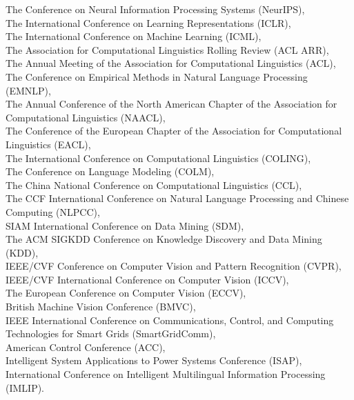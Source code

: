 \documentclass{resume}
\begin{document}
\begin{itemize}
The Conference on Neural Information Processing Systems (NeurIPS), \\
The International Conference on Learning Representations (ICLR), \\
The International Conference on Machine Learning (ICML), \\
The Association for Computational Linguistics Rolling Review (ACL ARR), \\
The Annual Meeting of the Association for Computational Linguistics (ACL), \\
The Conference on Empirical Methods in Natural Language Processing (EMNLP), \\
The Annual Conference of the North American Chapter of the Association for Computational Linguistics (NAACL), \\
The Conference of the European Chapter of the Association for Computational Linguistics (EACL), \\
The International Conference on Computational Linguistics (COLING), \\
The Conference on Language Modeling (COLM), \\
The China National Conference on Computational Linguistics (CCL), \\
The CCF International Conference on Natural Language Processing and Chinese Computing (NLPCC), \\
SIAM International Conference on Data Mining (SDM), \\
The ACM SIGKDD Conference on Knowledge Discovery and Data Mining (KDD), \\
IEEE/CVF Conference on Computer Vision and Pattern Recognition (CVPR), \\
IEEE/CVF International Conference on Computer Vision (ICCV), \\
The European Conference on Computer Vision (ECCV), \\
British Machine Vision Conference (BMVC), \\
IEEE International Conference on Communications, Control, and Computing Technologies for Smart Grids (SmartGridComm), \\
American Control Conference (ACC), \\
Intelligent System Applications to Power Systems Conference (ISAP), \\
International Conference on Intelligent Multilingual Information Processing (IMLIP).
\end{itemize}
\end{document}
